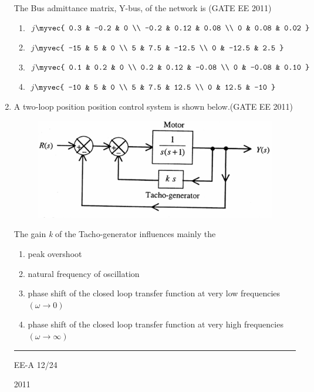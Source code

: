\documentclass[a4paper,10pt]{exam}
\theoremstyle{remark}
\begin{document}
\begin{enumerate}
The Bus admittance matrix, Y-bus, of the network is \hfill{(GATE EE 2011)}
\begin{multicols}{2}
\begin{enumerate}
\item \quad $j
\myvec{
0.3 & -0.2 & 0 \\
-0.2 & 0.12 & 0.08 \\
0 & 0.08 & 0.02
}$
\vspace{1.5em}
\item \quad $j
\myvec{
-15 & 5 & 0 \\
5 & 7.5 & -12.5 \\
0 & -12.5 & 2.5
}$

\vspace{1.5em}

\item \quad $j
\myvec{
0.1 & 0.2 & 0 \\
0.2 & 0.12 & -0.08 \\
0 & -0.08 & 0.10
}$

\vspace{1.5em}

\item \quad $j
\myvec{
-10 & 5 & 0 \\
5 & 7.5 & 12.5 \\
0 & 12.5 & -10
}$

\end{enumerate}
\end{multicols}

\item \quad A two-loop position position control system is shown below.\hfill{(GATE EE 2011)}

\begin{figure}[H]
    \centering
    \includegraphics[width=0.75\columnwidth]{figs/Q 45.png}\caption{}     \label{fig:myfigure}
\end{figure}
\raggedright{The gain \textit{k} of the Tacho-generator influences mainly the}

\begin{enumerate}
\item peak overshoot
\item natural frequency of oscillation
\item phase shift of the closed loop transfer function at very low frequencies $(\omega \rightarrow 0)$
\item phase shift of the closed loop transfer function at very high frequencies $(\omega \rightarrow \infty)$
\end{enumerate}
\vfill
\noindent\rule{\textwidth}{0.4pt}
\raggedright{EE-A}
\hfill
12/24
\newpage
\raggedright{2011}
\hfill
{}\\


\end{enumerate}
\end{document}
